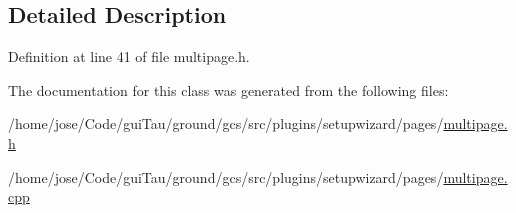 \subsection{Detailed Description}


Definition at line 41 of file multipage.\-h.



The documentation for this class was generated from the following files\-:\begin{DoxyCompactItemize}
\item 
/home/jose/\-Code/gui\-Tau/ground/gcs/src/plugins/setupwizard/pages/\hyperlink{multipage_8h}{multipage.\-h}\item 
/home/jose/\-Code/gui\-Tau/ground/gcs/src/plugins/setupwizard/pages/\hyperlink{multipage_8cpp}{multipage.\-cpp}\end{DoxyCompactItemize}
